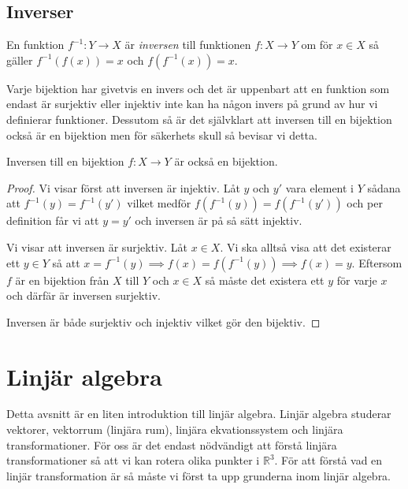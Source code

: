 \documentclass{article}
\theoremstyle{definition}
\begin{document}
\subsection{Inverser}
\begin{mydef}{}{}
  En funktion $f^{-1}: Y \rightarrow X$ är \textit{inversen} till funktionen 
  $f: X \rightarrow Y$ om för $x \in X$ så gäller $f^{-1}(f(x)) = x$ och $f(f^{-1}(x)) = x.$ 
\end{mydef}
Varje bijektion har givetvis en invers och det är uppenbart att en funktion som endast 
är surjektiv eller injektiv inte kan ha någon invers på grund av hur vi definierar funktioner. Dessutom så är det självklart att inversen 
till en bijektion också är en bijektion men för säkerhets skull så bevisar vi detta. 
\hypertarget{invbij}{}
\begin{mytheo}{}{}
  Inversen till en bijektion $f: X \rightarrow Y$ är också en bijektion.
\end{mytheo}
\begin{proof}
  Vi visar först att inversen är injektiv. Låt $y$ och $y'$ vara element i $Y$ sådana att 
  $f^{-1}(y) = f^{-1}(y')$ vilket medför $f(f^{-1}(y)) = f(f^{-1}(y'))$ och per definition 
  får vi att $y = y'$ och inversen är på så sätt injektiv.

  Vi visar att inversen är surjektiv.
  Låt $x \in X$. Vi ska alltså visa att det existerar ett $y \in Y$ så att 
  $x = f^{-1}(y) \implies f(x) = f(f^{-1}(y)) \implies f(x) = y.$ Eftersom 
  $f$ är en bijektion från $X$ till $Y$ och $x \in X$ så måste det existera ett $y$ för 
  varje $x$ och därfär är inversen surjektiv. 
  
  Inversen är både surjektiv och injektiv vilket gör den bijektiv.
\end{proof}

\section{Linjär algebra}
Detta avsnitt är en liten introduktion till linjär algebra. Linjär algebra studerar vektorer, vektorrum 
(linjära rum), linjära ekvationssystem och linjära transformationer. För oss är det endast nödvändigt 
att förstå linjära transformationer så att vi kan rotera olika punkter i $\mathbb{R}^3$. För att förstå 
vad en linjär transformation är så måste vi först ta upp grunderna inom linjär algebra. 

\end{document}
